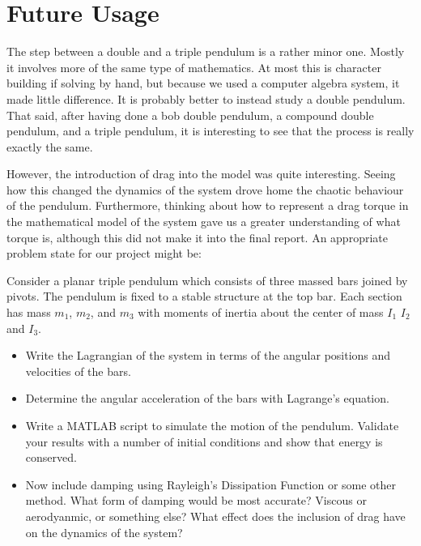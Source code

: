 \section{Future Usage}
The step between a double and a triple pendulum is a rather minor one. Mostly it involves more of the same type of mathematics. At most this is character building if solving by hand, but because we used a computer algebra system, it made little difference. It is probably better to instead study a double pendulum. That said, after having done a bob double pendulum, a compound double pendulum, and a triple pendulum, it is interesting to see that the process is really exactly the same. 

However, the introduction of drag into the model was quite interesting. Seeing how this changed the dynamics of the system drove home the chaotic behaviour of the pendulum. Furthermore, thinking about how to represent a drag torque in the mathematical model of the system gave us a greater understanding of what torque is, although this did not make it into the final report.
An appropriate problem state for our project might be:

Consider a planar triple pendulum which consists of three massed bars joined by pivots. The pendulum is fixed to a stable structure at the top bar. Each section has mass $m_1$, $m_2$, and $m_3$ with moments of inertia about the center of mass $I_1$ $I_2$ and $I_3$. 

\begin{itemize}
\item Write the Lagrangian of the system in terms of the angular positions and velocities of the bars.
\item Determine the angular acceleration of the bars with Lagrange's equation.
\item Write a MATLAB script to simulate the motion of the pendulum. Validate your results with a number of initial conditions and show that energy is conserved.
\item Now include damping using Rayleigh's Dissipation Function or some other method. What form of damping would be most accurate? Viscous or aerodyanmic, or something else? What effect does the inclusion of drag have on the dynamics of the system?
\end{itemize}
